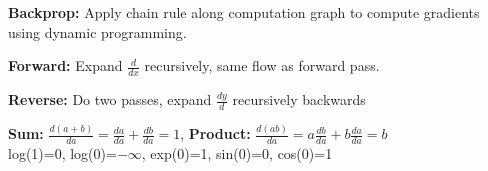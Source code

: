 \textbf{Backprop:} Apply chain rule along computation graph to compute gradients using dynamic programming.\\
\begin{comment}
The result of the Bauer paths starting from a certain node are summarized by storing the intermediate value. 
This also holds for taking the partial derivative of it.
The gradient can be computed in the same time complexity as f, as it uses the same components, although, the space complexity is higher, since the intermediate values must be stored as well. \\
\end{comment} 

\textbf{Forward:} Expand $\frac{d}{dx}$ recursively, same flow as forward pass.\\
\begin{comment}
The independent value is fixed. 
The flow of computation is exactly as with the forward pass, and can be done in the same iteration. Compute the intermediate result AND the derivative of it, with respect to it's inputs.	
The partial derivates can be stored as numerical value directly.\\
\end{comment}

\textbf{Reverse:} Do two passes, expand $\frac{dy}{d}$ recursively backwards\\
\begin{comment}
Also called reverse-mode automatic differentiation. 
First path computes intermediate values, second path computes derivatives backwards.
One must track the intermediate values and the composition of the sub-expressions to create the gradient in the backward path.
Mix-and-match forward and backward propagation is NP-complete.\\
\end{comment}

\textbf{Sum:} $\frac{d(a+b)}{da} = \frac{da}{da	} + \frac{db}{da} = 1$,
\textbf{Product:} $\frac{d(ab)}{da} = a\frac{db}{da	} + b\frac{da}{da} = b$\\

log(1)=0, log(0)=$-\infty$, exp(0)=1, sin(0)=0, cos(0)=1





 
